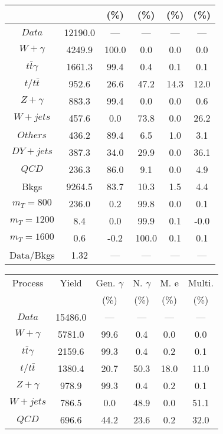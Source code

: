 \begin{figure}
\begin{minipage}[c]{0.32\textwidth}
{\begin{tabular}{cccccc}
 &  & (\%) & (\%) & (\%) & (\%)  \\
\hline
                                                                      $ Data $ &  12190.0 &  --- &  --- &  --- &  ---\\
$ W+\gamma $ &  4249.9 &  100.0 &  0.0 &  0.0 &  0.0\\
$ t\bar{t}\gamma $ &  1661.3 &  99.4 &  0.4 &  0.1 &  0.1\\
$ t/t\bar{t} $ &  952.6 &  26.6 &  47.2 &  14.3 &  12.0\\
$ Z+\gamma $ &  883.3 &  99.4 &  0.0 &  0.0 &  0.6\\
$ W+jets $ &  457.6 &  0.0 &  73.8 &  0.0 &  26.2\\
$ Others $ &  436.2 &  89.4 &  6.5 &  1.0 &  3.1\\
$ DY+jets $ &  387.3 &  34.0 &  29.9 &  0.0 &  36.1\\
$ QCD $ &  236.3 &  86.0 &  9.1 &  0.0 &  4.9\\
Bkgs &  9264.5 &  83.7 &  10.3 &  1.5 &  4.4\\
$ m_{T} = 800 $ &  236.0 &  0.2 &  99.8 &  0.0 &  0.1\\
$ m_{T} = 1200 $ &  8.4 &  0.0 &  99.9 &  0.1 &  -0.0\\
$ m_{T} = 1600 $ &  0.6 &  -0.2 &  100.0 &  0.1 &  0.1\\
Data/Bkgs &  1.32 &  --- &  --- &  --- &  ---\\
\hline
\end{tabular}
}
\end{minipage}
\begin{minipage}[c]{0.32\textwidth}
\centering
\tiny{
\begin{tabular}{cccccc}
\hline
Process & Yield & Gen. $\gamma$ & N. $\gamma$ & M. e & Multi. \\
 &  & (\%) & (\%) & (\%) & (\%)  \\
\hline
                                                                      $ Data $ &  15486.0 &  --- &  --- &  --- &  ---\\
$ W+\gamma $ &  5781.0 &  99.6 &  0.4 &  0.0 &  0.0\\
$ t\bar{t}\gamma $ &  2159.6 &  99.3 &  0.4 &  0.2 &  0.1\\
$ t/t\bar{t} $ &  1380.4 &  20.7 &  50.3 &  18.0 &  11.0\\
$ Z+\gamma $ &  978.9 &  99.3 &  0.4 &  0.2 &  0.1\\
$ W+jets $ &  786.5 &  0.0 &  48.9 &  0.0 &  51.1\\
$ QCD $ &  696.6 &  44.2 &  23.6 &  0.2 &  32.0\\

\end{tabular}}
\end{minipage}
\end{figure}

